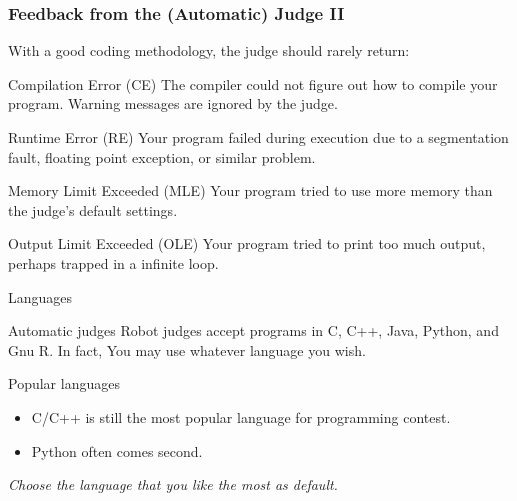 \documentclass{beamer}
\begin{document}
\begin{frame}
  \frametitle{Feedback from the (Automatic) Judge II}
  With a good coding methodology, the judge should rarely return:
  \begin{block}{Compilation Error (CE)}
    The compiler could not figure out how to compile your program. Warning messages are ignored by the judge.
  \end{block}

  \begin{block}{Runtime Error (RE)}
    Your program failed during execution due to a segmentation fault, floating point exception, or similar problem.
  \end{block}

  \begin{block}{Memory Limit Exceeded (MLE)}
    Your program tried to use more memory than the judge’s default settings.
  \end{block}

  \begin{block}{Output Limit Exceeded (OLE)}
    Your program tried to print too much output, perhaps trapped in a infinite loop.
  \end{block}

\end{frame}


\begin{frame}{Languages}

  \begin{block}{Automatic judges}
      Robot judges accept programs in C, C++, Java, Python, and Gnu R. In fact, You may use whatever language you wish. 
  \end{block}

  \begin{block}{Popular languages}
    \begin{itemize}
    \item C/C++ is still the most popular language for programming contest.
    \item Python often comes second.
    \end{itemize}
    \emph{Choose the language that you like the most as default.}
  \end{block}

  
  \end{frame}
\end{document}
